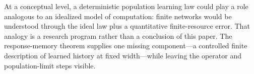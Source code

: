 At a conceptual level, a deterministic population learning law could play a
role analogous to an idealized model of computation: finite networks would be
understood through the ideal law plus a quantitative finite-resource error.
That analogy is a research program rather than a conclusion of this paper.
The response-memory theorem supplies one missing component---a controlled
finite description of learned history at fixed width---while leaving the
operator and population-limit steps visible.

